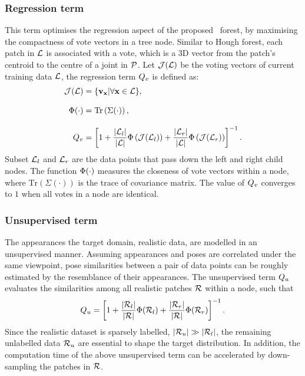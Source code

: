 \subsubsection{Regression term} 
This term optimises the regression aspect of the proposed \STR\ forest, by maximising the compactness of vote vectors in a tree node.  
Similar to Hough forest, each patch in $\mathcal{L}$ is associated with a vote, which is a 3D vector from the patch's centroid to the centre of a joint in $\mathcal{P}$. Let $\mathcal{J}(\mathcal{L})$ be the voting vectors of current training data $\mathcal{L}$, the regression term $Q_{v}$ is defined as: 
\begin{equation}
	\begin{aligned}
		\mathcal{J}(\mathcal{L}) & = \{ \mathbf{v}_{\mathbf{x}}|\forall \mathbf{x} \in \mathcal{L} \},\\[3mm]
		\mathrm{\Phi}(\cdot) & = \mathrm{Tr}\left(\Sigma(\cdot)\right),\\[3mm] 
	Q_{v} & = \left[ 1 + 
		\frac{|\mathcal{L}_{l}|}{|\mathcal{L}|} \mathrm{\Phi}\left(\mathcal{J}(\mathcal{L}_{l})\right) +  
	\frac{|\mathcal{L}_{r}|}{|\mathcal{L}|} \mathrm{\Phi}\left(\mathcal{J}(\mathcal{L}_{r})\right) \right]^{-1}.
	\end{aligned}
	\label{eqn/hand/regterm}
\end{equation}
Subset $\mathcal{L}_{l}$ and $\mathcal{L}_{r}$ are the data points that pass down the left and right child nodes. The function $\mathrm{\Phi}(\cdot)$ measures the closeness of vote vectors within a node, where $\mathrm{Tr}(\Sigma(\cdot))$ is the trace of covariance matrix. The value of $Q_{v}$ converges to $1$ when all votes in a node are identical. 

\subsubsection{Unsupervised term} 
The appearances the target domain, \ie realistic data, are modelled in an unsupervised manner.
Assuming appearances and poses are correlated under the same viewpoint, pose similarities between a pair of data points can be roughly estimated by the resemblance of their appearances. The unsupervised term $Q_{u}$ evaluates the similarities among all realistic patches $\mathcal{R}$ within a node, such that 
\begin{equation}
	Q_{u} = \left[ 1 + 
		\frac{|\mathcal{R}_{l}|}{|\mathcal{R}|} \mathrm{\Phi}(\mathcal{R}_{l}) +  
	\frac{|\mathcal{R}_{r}|}{|\mathcal{R}|} \mathrm{\Phi}(\mathcal{R}_{r}) \right]^{-1}.
	\label{eqn/hand/usterm}
\end{equation}
Since the realistic dataset is sparsely labelled, \ie $|\mathcal{R}_{u}| \gg |\mathcal{R}_{l}|$, the remaining unlabelled data $\mathcal{R}_{u}$ are essential to shape the target distribution. In addition, the computation time of the above unsupervised term can be accelerated by down-sampling the patches in $\mathcal{R}$.  

